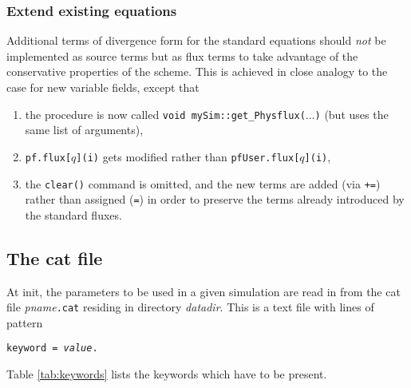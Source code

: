 \subsubsection{Extend existing equations}

Additional terms of divergence form for the standard equations
should {\it not} be implemented as source terms but as flux terms to
take advantage of the conservative properties of the scheme. This is
achieved in close analogy to the case for new variable fields, except that
\begin{enumerate}
\item the procedure is now called
  {\tt void mySim::get\_Physflux($\ldots$)} (but uses the same list of
  arguments),
\item {\tt pf.flux[$q$](i)} gets modified rather than
  {\tt pfUser.flux[$q$](i)},
\item the {\tt clear()} command is omitted, and the new terms are added
  (via {\tt +=}) rather than assigned ({\tt =}) in order to preserve
  the terms already introduced by the standard fluxes.
\end{enumerate}




\subsection{The cat file}
\label{sect:catfile}

At init, the parameters to be used in a given simulation are read in
from the cat file {\it pname}{\tt .cat} residing in directory
{\it datadir}. This is a text file with lines of pattern \\
\centerline{\tt keyword = {\it value}.}
Table \ref{tab:keywords} lists the keywords which have to be present.

